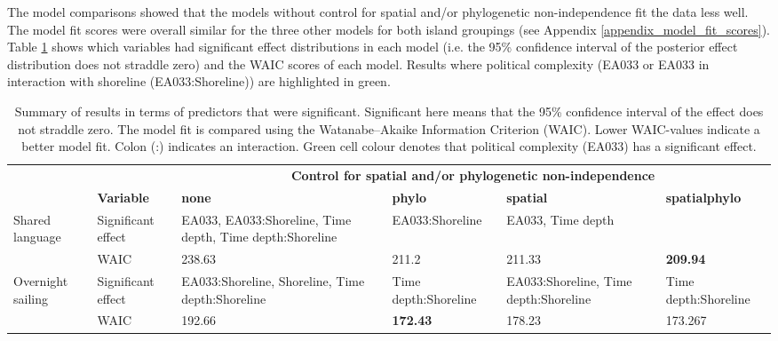 \documentclass[unnumsec,webpdf,modern,medium]{oup-authoring-template}
\begin{document}

The model comparisons showed that the models without control for spatial and/or phylogenetic non-independence fit the data less well. The model fit scores were overall similar for the three other models for both island groupings (see Appendix \ref{appendix_model_fit_scores}). Table \ref{brms_results_summary} shows which variables had significant effect distributions in each model (i.e. the 95\% confidence interval of the posterior effect distribution does not straddle zero) and the WAIC scores of each model. Results where political complexity (EA033 or EA033 in interaction with shoreline (EA033:Shoreline)) are highlighted in green.

\begin{table}[ht]
\centering
\begin{tabular}{p{2cm}p{1.8cm}|p{2.4cm}p{2.4cm}p{2.4cm}p{2cm}}
  \toprule
&&  \multicolumn{4}{c}{\textbf{Control for spatial and/or phylogenetic non-independence}}\linebreak\\
 & \textbf{	Variable	} & \textbf{	none	} & \textbf{	phylo	} & \textbf{	spatial	} & \textbf{	spatialphylo	} 	\\
\midrule
\multirow{2}{*}{Shared language}
 	&	Significant effect	&	\cellcolor{spec_color_lightgreen!50} EA033, EA033:Shoreline, Time depth, Time depth:Shoreline	&	\cellcolor{spec_color_lightgreen!50} EA033:Shoreline	&	\cellcolor{spec_color_lightgreen!50} EA033, Time depth &		\\
		&	WAIC	&	238.63	&	211.2	&	211.33	&	 \textbf{209.94}	\\
  \midrule
\multirow{2}{*}{Overnight sailing}	&	Significant effect	&	\cellcolor{spec_color_lightgreen!50} EA033:Shoreline, Shoreline, Time depth:Shoreline	&	Time depth:Shoreline	&	\cellcolor{spec_color_lightgreen!50} EA033:Shoreline, Time depth:Shoreline &	Time depth:Shoreline		\\
	&	WAIC	&	192.66	&	\textbf{172.43}	&	178.23&	173.267		\\

   \bottomrule
\end{tabular}
\caption{Summary of results in terms of predictors that were significant. Significant here means that the 95\% confidence interval of the effect does not straddle zero. The model fit is compared using the Watanabe–Akaike Information Criterion (WAIC). Lower WAIC-values indicate a better model fit. Colon (:) indicates an interaction. Green cell colour denotes that political complexity (EA033) has a significant effect. } 
\label{brms_results_summary}
\end{table}
\end{document}
